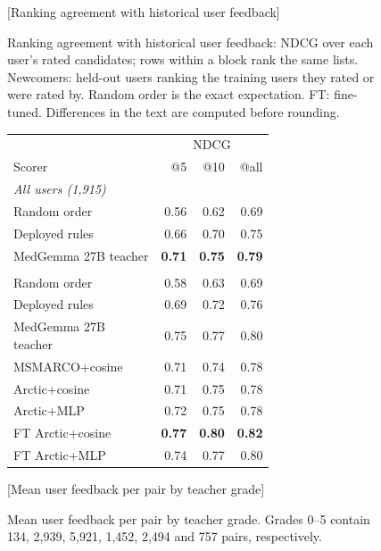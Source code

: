 \documentclass[runningheads,a4paper]{llncs}
\newcommand{\model}[1]{{\hyphenpenalty=10000 \exhyphenpenalty=10000 \textsf{#1}}}
\begin{document}
\begin{figure}[!tb]
\centering
\begin{minipage}[t]{0.53\textwidth}
\vspace{0pt}
[Ranking agreement with historical user feedback]{\raggedright
Ranking agreement with historical user feedback: NDCG over
each user's rated candidates; rows within a block rank the same lists. Newcomers:
held-out users ranking the training users they rated or were rated by.
Random order is the exact expectation. FT: fine-tuned. Differences in the text
are computed before rounding.}
\label{tab:feedback}
\smallskip
\centering\footnotesize
\setlength{\tabcolsep}{2.5pt}
\renewcommand{\arraystretch}{1.05}
\begin{tabular}{lrrr}
\toprule
& \multicolumn{3}{c}{NDCG} \\
Scorer & @5 & @10 & @all \\
\midrule
\multicolumn{4}{l}{\textit{All users (1,915)}} \\
Random order & 0.56 & 0.62 & 0.69 \\
Deployed rules & 0.66 & 0.70 & 0.75 \\
MedGemma 27B teacher & \textbf{0.71} & \textbf{0.75} & \textbf{0.79} \\
\addlinespace[2pt]
\multicolumn{4}{l}{\textit{Newcomers (201)}} \\
Random order & 0.58 & 0.63 & 0.69 \\
Deployed rules & 0.69 & 0.72 & 0.76 \\

\shortstack[l]{MedGemma 27B\\teacher} & 0.75 & 0.77 & 0.80 \\
\model{MSMARCO+cosine} & 0.71 & 0.74 & 0.78 \\
\model{Arctic+cosine} & 0.71 & 0.75 & 0.78 \\
\model{Arctic+MLP} & 0.72 & 0.75 & 0.78 \\
\model{FT Arctic+cosine} & \textbf{0.77} & \textbf{0.80} & \textbf{0.82} \\
\model{FT Arctic+MLP} & 0.74 & 0.77 & 0.80 \\
\bottomrule
\end{tabular}
\end{minipage}\hfill
\begin{minipage}[t]{0.44\textwidth}
\vspace{0pt}
\centering
\resizebox{\linewidth}{!}{}
\setlength{\abovecaptionskip}{2pt}%
[Mean user feedback per pair by teacher grade]{\raggedright
Mean user feedback per pair by teacher grade. Grades 0--5
contain 134, 2,939, 5,921, 1,452, 2,494 and 757 pairs, respectively.}
\label{fig:feedback}
\end{minipage}
\end{figure}
\end{document}
